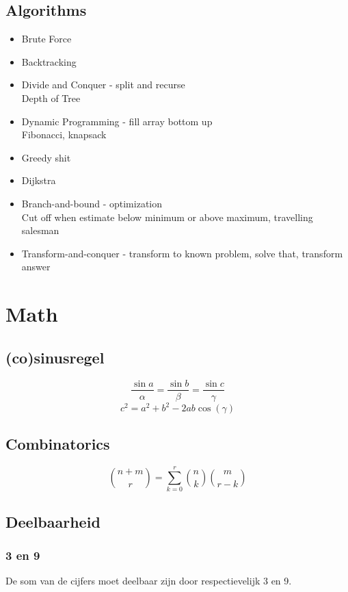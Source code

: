 \documentclass[10pt]{article}
\begin{document}
\subsection{Algorithms}
\begin{itemize}
\item Brute Force
\item Backtracking
\item Divide and Conquer - split and recurse \\
	Depth of Tree
\item Dynamic Programming - fill array bottom up \\
	Fibonacci, knapsack
\item Greedy shit
\item Dijkstra
\item Branch-and-bound - optimization \\
	Cut off when estimate below minimum or above maximum, travelling salesman
\item Transform-and-conquer - transform to known problem, solve that, transform answer
\end{itemize}

\section{Math}
\subsection{(co)sinusregel}

\[\frac{\sin a}{\alpha} = \frac{\sin b}{\beta} =\frac{\sin c}{\gamma}\]
\[c^2=a^2+b^2-2ab\cos(\gamma)\]

\subsection{Combinatorics}

\[\binom{n+m}{r} = \sum_{k=0}^r \binom{n}{k} \binom{m}{r-k}\]

\subsection{Deelbaarheid}

\subsubsection{3 en 9}

De som van de cijfers moet deelbaar zijn door respectievelijk 3 en 9.
\end{document}
